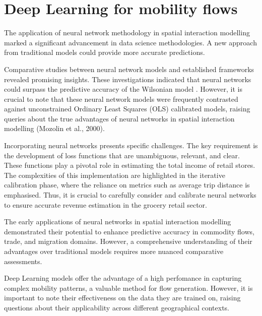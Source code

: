     \section{Deep Learning for mobility flows}

    The application of neural network methodology in spatial interaction modelling marked a significant advancement in data science methodologies. A new approach from traditional models could provide more accurate predictions. \citep{wilkinsonSpatialInteractionModels2023}
        
    Comparative studies between neural network models and established frameworks revealed promising insights. These investigations indicated that neural networks could surpass the predictive accuracy of the Wilsonian model \citep{fischerArtificialNeuralNetworks1994, blackSpatialInteractionModeling1995, wilkinsonSpatialInteractionModels2023}. However, it is crucial to note that these neural network models were frequently contrasted against unconstrained Ordinary Least Squares (OLS) calibrated models, raising queries about the true advantages of neural networks in spatial interaction modelling (Mozolin et al., 2000). \citep{wilkinsonSpatialInteractionModels2023}
        
    Incorporating neural networks presents specific challenges. The key requirement is the development of loss functions that are unambiguous, relevant, and clear. These functions play a pivotal role in estimating the total income of retail stores. The complexities of this implementation are highlighted in the iterative calibration phase, where the reliance on metrics such as average trip distance is emphasised. Thus, it is crucial to carefully consider and calibrate neural networks to ensure accurate revenue estimation in the grocery retail sector. \citep{wilkinsonSpatialInteractionModels2023}
        
    The early applications of neural networks in spatial interaction modelling demonstrated their potential to enhance predictive accuracy in commodity flows, trade, and migration domains. However, a comprehensive understanding of their advantages over traditional models requires more nuanced comparative assessments\citep{wilkinsonSpatialInteractionModels2023}.

    Deep Learning models offer the advantage of a high perfomance in capturing complex mobility patterns, a valuable method for flow generation. However, it is important to note their effectiveness on the data they are trained on, raising questions about their applicability across different geographical contexts. \citep{wilkinsonSpatialInteractionModels2023}

